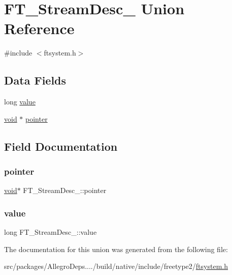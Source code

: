 \hypertarget{union_f_t___stream_desc__}{}\section{F\+T\+\_\+\+Stream\+Desc\+\_\+ Union Reference}
\label{union_f_t___stream_desc__}


{\ttfamily \#include $<$ftsystem.\+h$>$}

\subsection*{Data Fields}
\begin{DoxyCompactItemize}
\item 
long \hyperlink{union_f_t___stream_desc___a1a94493032faef1c3ed7bc33816ce90c}{value}
\item 
\hyperlink{png_8h_ac9c84fa68bbad002983e35ce3663c686}{void} $\ast$ \hyperlink{union_f_t___stream_desc___a410ed102dc377fb9a5b9c950c3f863dc}{pointer}
\end{DoxyCompactItemize}


\subsection{Field Documentation}
\mbox{\label{union_f_t___stream_desc___a410ed102dc377fb9a5b9c950c3f863dc}} 
\subsubsection{\texorpdfstring{pointer}{pointer}}
{\footnotesize\ttfamily \hyperlink{png_8h_ac9c84fa68bbad002983e35ce3663c686}{void}$\ast$ F\+T\+\_\+\+Stream\+Desc\+\_\+\+::pointer}

\mbox{\label{union_f_t___stream_desc___a1a94493032faef1c3ed7bc33816ce90c}} 
\subsubsection{\texorpdfstring{value}{value}}
{\footnotesize\ttfamily long F\+T\+\_\+\+Stream\+Desc\+\_\+\+::value}



The documentation for this union was generated from the following file\+:\begin{DoxyCompactItemize}
\item 
src/packages/\+Allegro\+Deps..../build/native/include/freetype2/\hyperlink{ftsystem_8h}{ftsystem.\+h}\end{DoxyCompactItemize}
